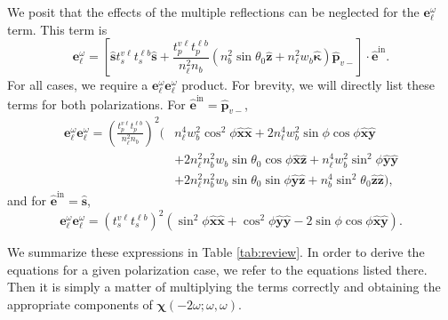 We posit that the effects of the multiple reflections can be neglected for the
$\mathbf{e}^{\omega}_{\ell}$ term. This term is
\begin{equation*}\label{eq:ewell}
\mathbf{e}^{\omega}_{\ell} = 
\left[
\hat{\mathbf{s}}t_{s}^{v\ell}t_{s}^{\ell b}\hat{\mathbf{s}} 
+ \frac{t^{v\ell}_{p}t^{\ell b}_{p}}{n^{2}_{\ell}n_{b}}
\left(
  n^{2}_{b}\sin\theta_{0}\hat{\mathbf{z}} 
+ n^{2}_{\ell}w_{b}\hat{\boldsymbol{\kappa}}
\right)
\hat{\mathbf{p}}_{v-}
\right]
\cdot\hat{\mathbf{e}}^{\mathrm{in}}.
\end{equation*}
For all cases, we require a
$\mathbf{e}^{\omega}_{\ell}\mathbf{e}^{\omega}_{\ell}$ product. For brevity, we
will directly list these terms for both polarizations. For
$\hat{\mathbf{e}}^{\mathrm{in}} = \hat{\mathbf{p}}_{v-}$,
\begin{equation}\label{eq:ewewp}
\begin{split}
\mathbf{e}^{\omega}_{\ell}\mathbf{e}^{\omega}_{\ell}
= \left(\frac{t^{v\ell}_{p}t^{\ell b}_{p}}
{n^{2}_{\ell}n_{b}}\right)^{2}
\big(
  &n^{4}_{\ell}w^{2}_{b}\cos^{2}\phi
\hat{\mathbf{x}}\hat{\mathbf{x}}
+ 2n^{4}_{\ell}w^{2}_{b}\sin\phi\cos\phi
\hat{\mathbf{x}}\hat{\mathbf{y}}\\
&+ 2n^{2}_{\ell}n^{2}_{b}w_{b}\sin\theta_{0}\cos\phi
\hat{\mathbf{x}}\hat{\mathbf{z}}
+ n^{4}_{\ell}w^{2}_{b}\sin^{2}\phi
\hat{\mathbf{y}}\hat{\mathbf{y}}\\
&+ 2n^{2}_{\ell}n^{2}_{b}w_{b}\sin\theta_{0}\sin\phi
\hat{\mathbf{y}}\hat{\mathbf{z}}
+ n^{4}_{b}\sin^{2}\theta_{0}
\hat{\mathbf{z}}\hat{\mathbf{z}}
\big),
\end{split}
\end{equation}
and for $\hat{\mathbf{e}}^{\mathrm{in}} = \hat{\mathbf{s}}$,
\begin{equation}\label{eq:ewews}
\mathbf{e}^{\omega}_{\ell}\mathbf{e}^{\omega}_{\ell}
= \left(t^{v\ell}_{s}t^{\ell b}_{s}\right)^{2}
\left(
  \sin^{2}\phi\hat{\mathbf{x}}\hat{\mathbf{x}}
+ \cos^{2}\phi\hat{\mathbf{y}}\hat{\mathbf{y}} 
- 2\sin\phi\cos\phi\hat{\mathbf{x}}\hat{\mathbf{y}}
\right).
\end{equation}

We summarize these expressions in Table \ref{tab:review}. In order to derive the
equations for a given polarization case, we refer to the equations listed there.
Then it is simply a matter of multiplying the terms correctly and obtaining the
appropriate components of $\boldsymbol{\chi}(-2\omega; \omega, \omega)$.

